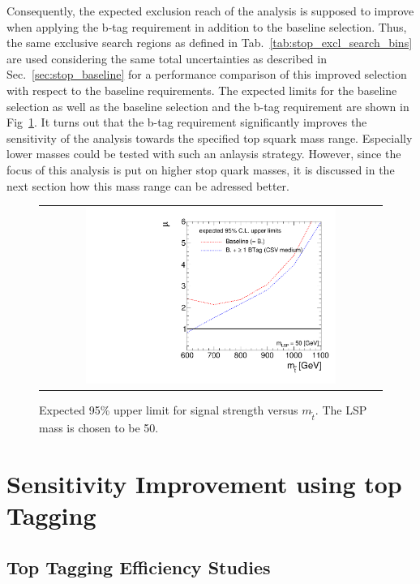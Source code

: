 Consequently, the expected exclusion reach of the analysis is supposed to improve when applying the b-tag requirement in addition to the baseline selection. Thus, the same exclusive search regions as defined in Tab.~\ref{tab:stop_excl_search_bins} are used considering the same total uncertainties as described in Sec.~\ref{sec:stop_baseline} for a performance comparison of this improved selection with respect to the baseline requirements. The expected limits for the baseline selection as well as the baseline selection and the b-tag requirement are shown in Fig~\ref{fig:stop_baselinebtag_limit}. It turns out that the b-tag requirement significantly improves the sensitivity of the analysis towards the specified top squark mass range. Especially lower masses could be tested with such an anlaysis strategy. However, since the focus of this analysis is put on higher stop quark masses, it is discussed in the next section how this mass range can be adressed better.  

\begin{figure}[!h]
  \centering
  \begin{tabular}{c}
                \includegraphics[width=0.75\textwidth]{figures/limitplot4BinSel_BaselineBTag.pdf} 
  \end{tabular}
  \caption{Expected 95\% upper limit for signal strength versus $m_{\tilde{t}}$. The LSP mass is chosen to be 50\gev.}
  \label{fig:stop_baselinebtag_limit}
\end{figure}

\section{Sensitivity Improvement using top Tagging}
\label{sec:stop_btagging}

\subsection{Top Tagging Efficiency Studies}
\label{subsec:stop_toptagging}

